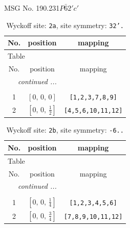 \documentclass[fleqn,8pt]{jsarticle}
\begin{document}
\setcounter{MaxMatrixCols}{32}

\renewcommand{\tablename}{Table~}
\renewcommand{\figurename}{Figure~}
\begin{center}
\LARGE
MSG No. 190.231\quad$P\bar{6}2'c'$
\end{center}
\renewcommand{\arraystretch}{1.2}
\begin{longtable}{ccc}
\caption{Wyckoff site: {\tt 2a}, site symmetry: {\tt 32'.}}
 \\
 \hline \hline
No. & position & mapping \\ \hline \endfirsthead

\multicolumn{2}{l}{\tablename\ \thetable{}} \\
 \hline \hline
No. & position & mapping \\ \hline \endhead

 \hline \hline
\multicolumn{2}{r}{\footnotesize\it continued ...} \\ \endfoot

 \hline \hline
\multicolumn{2}{r}{} \\ \endlastfoot

1 & $\left[ 0,\, 0,\, 0 \right]$ & {\tt [1,2,3,7,8,9]} \\ \hline
2 & $\left[ 0,\, 0,\, \frac{1}{2} \right]$ & {\tt [4,5,6,10,11,12]} \\
\end{longtable}
\renewcommand{\arraystretch}{1.2}
\begin{longtable}{ccc}
\caption{Wyckoff site: {\tt 2b}, site symmetry: {\tt -6..}}
 \\
 \hline \hline
No. & position & mapping \\ \hline \endfirsthead

\multicolumn{2}{l}{\tablename\ \thetable{}} \\
 \hline \hline
No. & position & mapping \\ \hline \endhead

 \hline \hline
\multicolumn{2}{r}{\footnotesize\it continued ...} \\ \endfoot

 \hline \hline
\multicolumn{2}{r}{} \\ \endlastfoot

1 & $\left[ 0,\, 0,\, \frac{1}{4} \right]$ & {\tt [1,2,3,4,5,6]} \\ \hline
2 & $\left[ 0,\, 0,\, \frac{3}{4} \right]$ & {\tt [7,8,9,10,11,12]} \\
\end{longtable}
\end{document}
